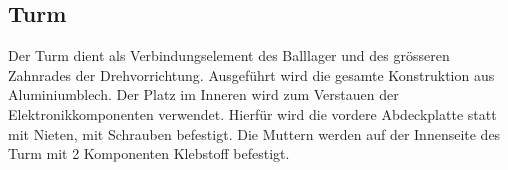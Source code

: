 \subsection{Turm}
Der Turm dient als Verbindungselement des Balllager und des grösseren 
Zahnrades der Drehvorrichtung. Ausgeführt wird die gesamte Konstruktion aus 
Aluminiumblech. Der Platz im Inneren wird zum Verstauen der 
Elektronikkomponenten verwendet. Hierfür wird die vordere Abdeckplatte statt mit Nieten, mit Schrauben befestigt. Die Muttern werden auf der Innenseite des Turm mit 2 Komponenten Klebstoff befestigt.